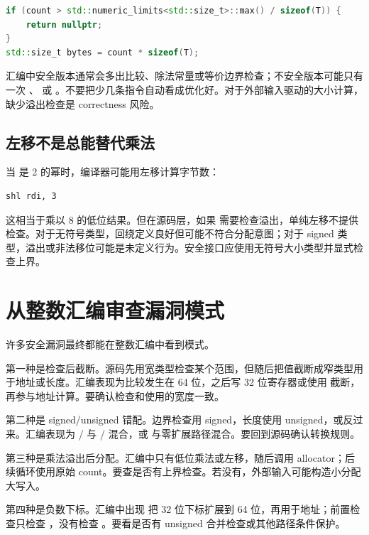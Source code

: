 \begin{lstlisting}[language=C++]
if (count > std::numeric_limits<std::size_t>::max() / sizeof(T)) {
    return nullptr;
}
std::size_t bytes = count * sizeof(T);
\end{lstlisting}

汇编中安全版本通常会多出比较、除法常量或等价边界检查；不安全版本可能只有一次 、 或 。不要把少几条指令自动看成优化好。对于外部输入驱动的大小计算，缺少溢出检查是 correctness 风险。

\subsection{左移不是总能替代乘法}

当  是 2 的幂时，编译器可能用左移计算字节数：

\begin{lstlisting}
shl rdi, 3
\end{lstlisting}

这相当于乘以 8 的低位结果。但在源码层，如果  需要检查溢出，单纯左移不提供检查。对于无符号类型，回绕定义良好但可能不符合分配意图；对于 signed 类型，溢出或非法移位可能是未定义行为。安全接口应使用无符号大小类型并显式检查上界。

\section{从整数汇编审查漏洞模式}

许多安全漏洞最终都能在整数汇编中看到模式。

第一种是检查后截断。源码先用宽类型检查某个范围，但随后把值截断成窄类型用于地址或长度。汇编表现为比较发生在 64 位，之后写 32 位寄存器或使用  截断，再参与地址计算。要确认检查和使用的宽度一致。

第二种是 signed/unsigned 错配。边界检查用 signed，长度使用 unsigned，或反过来。汇编表现为 / 与 / 混合，或  与零扩展路径混合。要回到源码确认转换规则。

第三种是乘法溢出后分配。汇编中只有低位乘法或左移，随后调用 allocator；后续循环使用原始 count。要查是否有上界检查。若没有，外部输入可能构造小分配大写入。

第四种是负数下标。汇编中出现  把 32 位下标扩展到 64 位，再用于地址；前置检查只检查 ，没有检查 。要看是否有 unsigned 合并检查或其他路径条件保护。

